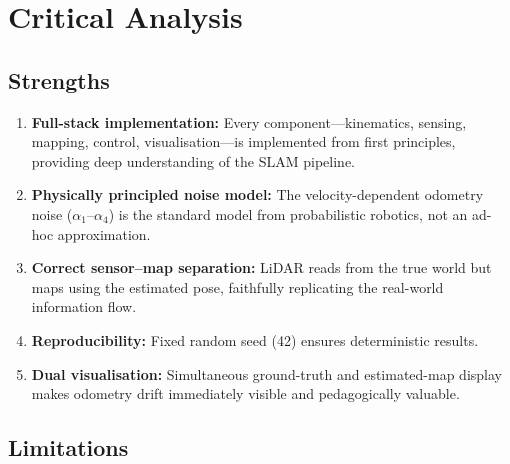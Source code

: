 \documentclass[12pt,a4paper]{article}
\begin{document}
\section{Critical Analysis}

\subsection{Strengths}

\begin{enumerate}
    \item \textbf{Full-stack implementation:} Every component---kinematics, sensing, mapping, control, visualisation---is implemented from first principles, providing deep understanding of the SLAM pipeline.
    \item \textbf{Physically principled noise model:} The velocity-dependent odometry noise (\(\alpha_1\)--\(\alpha_4\)) is the standard model from probabilistic robotics, not an ad-hoc approximation.
    \item \textbf{Correct sensor--map separation:} LiDAR reads from the true world but maps using the estimated pose, faithfully replicating the real-world information flow.
    \item \textbf{Reproducibility:} Fixed random seed (42) ensures deterministic results.
    \item \textbf{Dual visualisation:} Simultaneous ground-truth and estimated-map display makes odometry drift immediately visible and pedagogically valuable.
\end{enumerate}

\subsection{Limitations}
\end{document}
